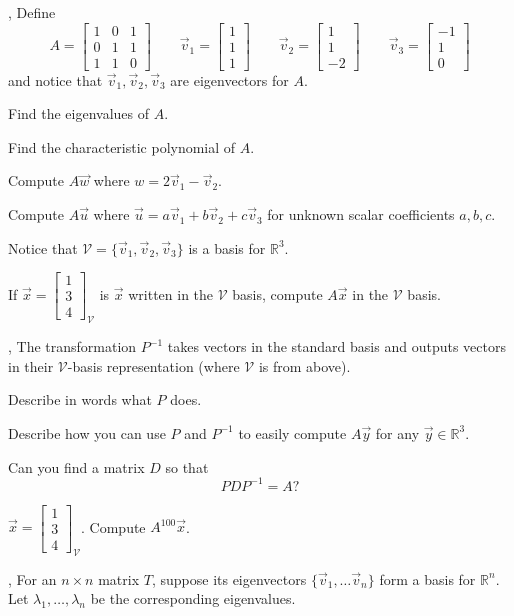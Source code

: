 \documentclass[letter]{article}
\newcommand{\R}{\mathbb{R}}
\newcommand{\mat}[1]{\begin{bmatrix}#1\end{bmatrix}}
\begin{document}
	\sep
	Define
	\[
		A=\mat{1&0&1\\0&1&1\\1&1&0}\qquad
		\vec v_1=\mat{1\\1\\1}\qquad
		\vec v_2=\mat{1\\1\\-2}\qquad
		\vec v_3=\mat{-1\\1\\0}
	\]
	and notice that $\vec v_1,\vec v_2,\vec v_3$ are eigenvectors for $A$.
	\begin{Enum}
		\item Find the eigenvalues of $A$.
		\item Find the characteristic polynomial of $A$.
		\item Compute $A\vec w$ where $w=2\vec v_1-\vec v_2$.
		\item Compute $A\vec u$ where $\vec u=a\vec v_1+b\vec v_2+c\vec v_3$ for
			unknown scalar coefficients $a,b,c$.
	\end{Enum}
	Notice that $\mathcal V=\{\vec v_1,\vec v_2,\vec v_3\}$ is a basis for $\R^3$.
	\begin{Enum}[resume]
	\item If $\vec x=\mat{1\\3\\4}_{\mathcal V}$ is $\vec x$ written in the $\mathcal V$ basis,
		compute $A\vec x$ in the $\mathcal V$ basis.
	\end{Enum}
	
	\sep
	The transformation $P^{-1}$ takes vectors in the standard basis and outputs
	vectors in their $\mathcal V$-basis representation (where $\mathcal V$ is from above).  
	\begin{Enum}
		\item Describe in words what $P$ does.
		\item Describe how you can use $P$ and $P^{-1}$ to easily compute
			$A\vec y$ for any $\vec y\in \R^3$.
		\item Can you find a matrix $D$ so that
			\[
				PDP^{-1}=A?
			\]
		\item $\vec x=\mat{1\\3\\4}_{\mathcal V}$.  Compute $A^{100}\vec x$.
	\end{Enum}


	\sep
	For an $n\times n$ matrix $T$, suppose its eigenvectors $\{\vec v_1,\ldots \vec v_n\}$
	form a basis for $\R^n$.  Let $\lambda_1,\ldots,\lambda_n$ be the corresponding
	eigenvalues.
	
\end{document}
